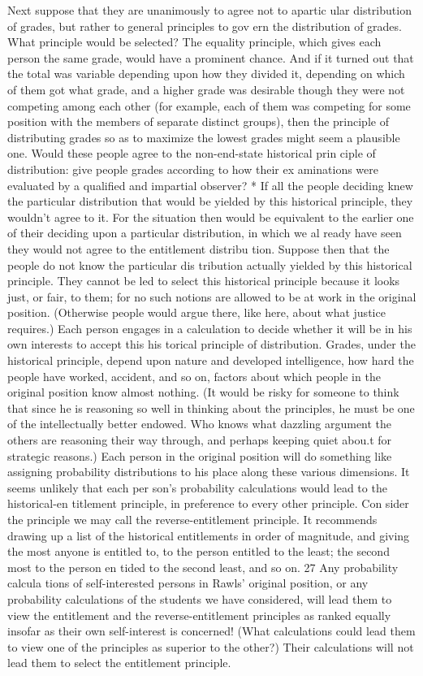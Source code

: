 \documentclass[11pt,openany]{book}
\begin{document}
Next suppose that they are unanimously to agree not to apartic ular distribution of grades, but rather to general principles to gov ern the distribution of grades. What principle would be selected? The equality principle, which gives each person the same grade, would have a prominent chance. And if it turned out that the total was variable depending upon how they divided it, depending on which of them got what grade, and a higher grade was desirable though they were not competing among each other (for example, each of them was competing for some position with the members of separate distinct groups), then the principle of distributing grades so as to maximize the lowest grades might seem a plausible one. Would these people agree to the non-end-state historical prin ciple of distribution: give people grades according to how their ex aminations were evaluated by a qualified and impartial observer? * If all the people deciding knew the particular distribution that would be yielded by this historical principle, they wouldn't agree to it. For the situation then would be equivalent to the earlier one of their deciding upon a particular distribution, in which we al ready have seen they would not agree to the entitlement distribu tion. Suppose then that the people do not know the particular dis tribution actually yielded by this historical principle. They cannot be led to select this historical principle because it looks just, or fair, to them; for no such notions are allowed to be at work in the original position. (Otherwise people would argue there, like here, about what justice requires.) Each person engages in a calculation to decide whether it will be in his own interests to accept this his torical principle of distribution. Grades, under the historical principle, depend upon nature and developed intelligence, how hard the people have worked, accident, and so on, factors about which people in the original position know almost nothing. (It would be risky for someone to think that since he is reasoning so well in thinking about the principles, he must be one of the intellectually better endowed. Who knows what dazzling argument the others are reasoning their way through, and perhaps keeping quiet abou.t for strategic reasons.) Each person in the original position will do something like assigning probability distributions to his place along these various dimensions. It seems unlikely that each per son's probability calculations would lead to the historical-en titlement principle, in preference to every other principle. Con sider the principle we may call the reverse-entitlement principle. It recommends drawing up a list of the historical entitlements in order of magnitude, and giving the most anyone is entitled to, to the person entitled to the least; the second most to the person en tided to the second least, and so on. 27 Any probability calcula tions of self-interested persons in Rawls' original position, or any probability calculations of the students we have considered, will lead them to view the entitlement and the reverse-entitlement principles as ranked equally insofar as their own self-interest is concerned! (What calculations could lead them to view one of the principles as superior to the other?) Their calculations will not lead them to select the entitlement principle. 
\end{document}
